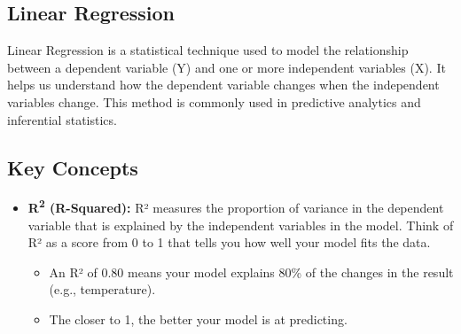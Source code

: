 \subsection{Linear Regression}

Linear Regression is a statistical technique used to model the relationship between a dependent variable (Y) and one or more independent variables (X). It helps us understand how the dependent variable changes when the independent variables change. This method is commonly used in predictive analytics and inferential statistics.

\subsection*{Key Concepts}

\begin{itemize}
    \item \textbf{R\textsuperscript{2} (R-Squared):} R² measures the proportion of variance in the dependent variable that is explained by the independent variables in the model. Think of R² as a score from 0 to 1 that tells you how well your model fits the data.
    \begin{itemize}
        \item An R² of 0.80 means your model explains 80\% of the changes in the result (e.g., temperature). 
        \item The closer to 1, the better your model is at predicting.
    \end{itemize}


\end{itemize}
